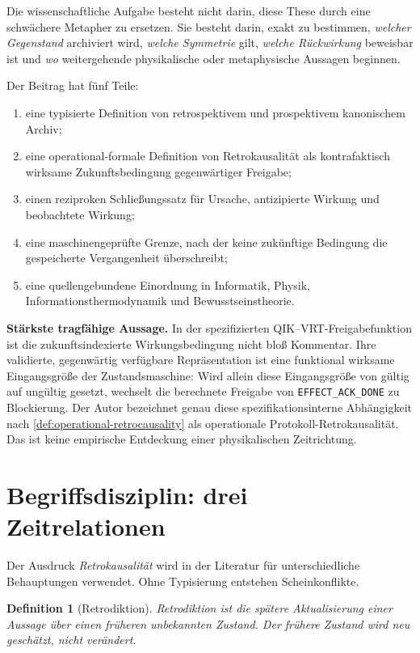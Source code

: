 \documentclass[11pt,a4paper]{article}
\newtheorem{definition}{Definition}[section]
\theoremstyle{remark}
\newcommand{\DONE}{\texttt{EFFECT\_ACK\_DONE}}
\newcommand{\statusbox}[2]{%
  \par\medskip\noindent
  \colorbox{#1}{\parbox{\dimexpr\linewidth-2\fboxsep\relax}{#2}}%
  \par\medskip
}
\begin{document}
Die wissenschaftliche Aufgabe besteht nicht darin, diese These durch eine
schwächere Metapher zu ersetzen. Sie besteht darin, exakt zu bestimmen,
\emph{welcher Gegenstand} archiviert wird, \emph{welche Symmetrie} gilt,
\emph{welche Rückwirkung} beweisbar ist und \emph{wo} weitergehende
physikalische oder metaphysische Aussagen beginnen.

Der Beitrag hat fünf Teile:

\begin{enumerate}
  \item eine typisierte Definition von retrospektivem und prospektivem
  kanonischem Archiv;
  \item eine operational-formale Definition von Retrokausalität als
  kontrafaktisch wirksame Zukunftsbedingung gegenwärtiger Freigabe;
  \item einen reziproken Schließungssatz für Ursache, antizipierte Wirkung
  und beobachtete Wirkung;
  \item eine maschinengeprüfte Grenze, nach der keine zukünftige Bedingung die
  gespeicherte Vergangenheit überschreibt;
  \item eine quellengebundene Einordnung in Informatik, Physik,
  Informationsthermodynamik und Bewusstseinstheorie.
\end{enumerate}

\statusbox{QGreen}{
\textbf{Stärkste tragfähige Aussage.}
In der spezifizierten QIK--VRT-Freigabefunktion ist die zukunftsindexierte
Wirkungsbedingung nicht bloß Kommentar. Ihre validierte, gegenwärtig
verfügbare Repräsentation ist eine funktional wirksame Eingangsgröße der
Zustandsmaschine:
Wird allein diese Eingangsgröße von gültig auf ungültig gesetzt, wechselt die
berechnete Freigabe von \DONE{} zu Blockierung. Der Autor bezeichnet genau
diese spezifikationsinterne Abhängigkeit nach
\cref{def:operational-retrocausality} als operationale
Protokoll-Retrokausalität. Das ist keine empirische Entdeckung einer
physikalischen Zeitrichtung.
}

\section{Begriffsdisziplin: drei Zeitrelationen}

Der Ausdruck \emph{Retrokausalität} wird in der Literatur für
unterschiedliche Behauptungen verwendet. Ohne Typisierung entstehen
Scheinkonflikte.

\begin{definition}[Retrodiktion]
Retrodiktion ist die spätere Aktualisierung einer Aussage über einen früheren
unbekannten Zustand. Der frühere Zustand wird neu geschätzt, nicht verändert.
\end{definition}
\end{document}
